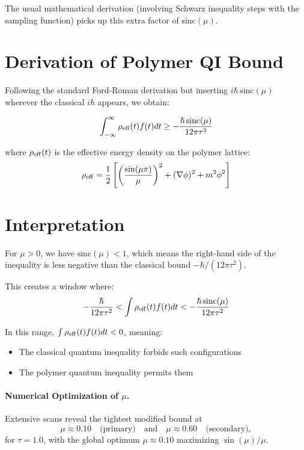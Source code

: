 \documentclass[11pt]{article}
\begin{document}
The usual mathematical derivation (involving Schwarz inequality steps with the sampling function) picks up this extra factor of $\mathrm{sinc}(\mu)$.

\section{Derivation of Polymer QI Bound}

Following the standard Ford-Roman derivation but inserting $i\hbar\,\mathrm{sinc}(\mu)$ wherever the classical $i\hbar$ appears, we obtain:

\begin{equation}
\int_{-\infty}^{\infty} \rho_{\rm eff}(t) f(t) dt \geq -\frac{\hbar\,\mathrm{sinc}(\mu)}{12\pi\tau^2}
\end{equation}

where $\rho_{\rm eff}(t)$ is the effective energy density on the polymer lattice:
\begin{equation}
\rho_{\rm eff} = \frac{1}{2}\left[\left(\frac{\sin(\mu\pi)}{\mu}\right)^2 + (\nabla\phi)^2 + m^2\phi^2\right]
\end{equation}

\section{Interpretation}

For $\mu > 0$, we have $\mathrm{sinc}(\mu) < 1$, which means the right-hand side of the inequality is less negative than the classical bound $-\hbar/(12\pi\tau^2)$.

This creates a window where:
\begin{equation}
-\frac{\hbar}{12\pi\tau^2} < \int \rho_{\rm eff}(t) f(t) dt < -\frac{\hbar\,\mathrm{sinc}(\mu)}{12\pi\tau^2}
\end{equation}

In this range, $\int \rho_{\rm eff}(t) f(t) dt < 0$, meaning:
\begin{itemize}
\item The classical quantum inequality forbids such configurations
\item The polymer quantum inequality permits them
\end{itemize}

\paragraph{Numerical Optimization of $\mu$.}
Extensive scans reveal the tightest modified bound at
\[
  \mu \approx 0.10 \quad\text{(primary)} \quad\text{and}\quad \mu \approx 0.60 \quad\text{(secondary)},
\]
for $\tau=1.0$, with the global optimum $\mu\approx0.10$ maximizing $\sin(\mu)/\mu$.  
\end{document}
